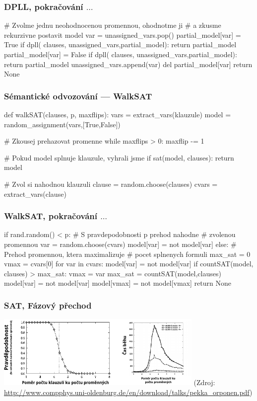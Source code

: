\documentclass[red,professionalfont]{beamer}
\theoremstyle{definition}
\newcommand{\0}{\mbox{${\bf 0}$}}
\begin{document}
\begin{frame}[fragile]\frametitle{DPLL, pokračování $\ldots$}
\begin{python}
  # Zvolme jednu neohodnocenou promennou, ohodnotme ji
  # a zkusme rekurzivne postavit model 
  var = unassigned_vars.pop()
  partial_model[var] = True
  if dpll( clauses, unassigned_vars,partial_model): return partial_model
  partial_model[var] = False
  if dpll( clauses, unassigned_vars,partial_model): return partial_model
  unassigned_vars.append(var)
  del partial_model[var]
  return None
\end{python}

\end{frame}

\begin{frame}[fragile]\frametitle{Sémantické odvozování --- WalkSAT}
\begin{python}
def walkSAT(clauses, p, maxflips):
  vars  = extract_vars(klauzule)
  model = random_assignment(vars,[True,False])

  # Zkousej prehazovat promenne 
  while maxflips > 0:
    maxflip -= 1
    
    # Pokud model splnuje klauzule, vyhrali jsme
    if sat(model, clauses): return model
    
    # Zvol si nahodnou klauzuli
    clause = random.choose(clauses)
    cvars = extract_vars(clause)
\end{python}
\end{frame}
\begin{frame}[fragile]\frametitle{WalkSAT, pokračování $\ldots$}
\begin{python}
    if rand.random() < p:
      # S pravdepodobnosti p prehod nahodne
      # zvolenou promennou
      var = random.choose(cvars)
      model[var] = not model[var]
    else:
      # Prehod promennou, ktera maximalizuje
      # pocet splnenych formuli
      max_sat = 0
      vmax = cvars[0]
      for var in cvars:
        model[var] = not model[var]
        if countSAT(model, clauses) > max_sat:
          vmax = var
          max_sat = countSAT(model,clauses)
        model[var] = not model[var]
      model[vmax] = not model[vmax]        
  return None
\end{python}
\end{frame}

\begin{frame}\frametitle{SAT, Fázový přechod}
\begin{center}
\includegraphics[width=10cm]{sat-phase-transition.pdf}
\vskip2cm
\tiny
(Zdroj: \url{http://www.compphys.uni-oldenburg.de/en/download/talks/pekka_orponen.pdf})
\end{center}

\end{frame}
\end{document}
